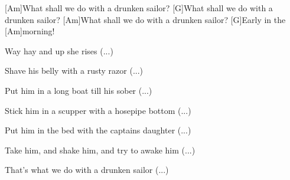 



\begin{guitar}
	[Am]What shall we do with a drunken sailor?
	[G]What shall we do with a drunken sailor?
	[Am]What shall we do with a drunken sailor?
	[G]Early in the [Am]morning!
	
	Way hay and up she rises (...)
	
	Shave his belly with a rusty razor (...)
	
	Put him in a long boat till his sober (...)
	
	Stick him in a scupper with a hosepipe bottom (...)
	
	Put him in the bed with the captains daughter (...)
	
	Take him, and shake him, and try to awake him (...)
	
	That's what we do with a drunken sailor (...)
\end{guitar}